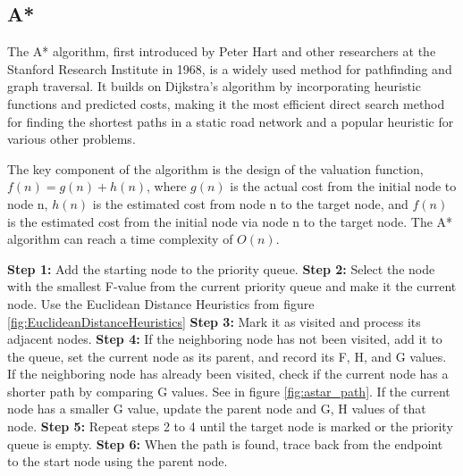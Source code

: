 \documentclass[bibliography=totoc]{scrartcl}
\begin{document}
\subsection{A*}

The A* algorithm, first introduced by Peter Hart and other researchers at the Stanford Research Institute in 1968, is a widely used method for pathfinding and graph traversal. \cite{4082128} It builds on Dijkstra's algorithm by incorporating heuristic functions and predicted costs, making it the most efficient direct search method for finding the shortest paths in a static road network and a popular heuristic for various other problems.\cite{ProbabilisticApproachCollaborativeMultiRobotLocalization}

The key component of the algorithm is the design of the valuation function, $f(n) = g(n) + h(n)$, where $g(n)$ is the actual cost from the initial node to node n, $h(n)$ is the estimated cost from node n to the target node, and $f(n)$ is the estimated cost from the initial node via node n to the target node. The A* algorithm can reach a time complexity of $O(n)$.

\textbf{Step 1:} Add the starting node to the priority queue.
\newline
\textbf{Step 2:} Select the node with the smallest F-value from the current priority queue and make it the current node. Use the Euclidean Distance Heuristics from figure \ref{fig:EuclideanDistanceHeuristics}
\newline
\textbf{Step 3:} Mark it as visited and process its adjacent nodes.
\newline
\textbf{Step 4:} If the neighboring node has not been visited, add it to the queue, set the current node as its parent, and record its F, H, and G values. 
If the neighboring node has already been visited, check if the current node has a shorter path by comparing G values. See in figure \ref{fig:astar_path}.
If the current node has a smaller G value, update the parent node and G, H values of that node.
\newline
\textbf{Step 5:} Repeat steps 2 to 4 until the target node is marked or the priority queue is empty.
\newline
\textbf{Step 6:} When the path is found, trace back from the endpoint to the start node using the parent node.
\end{document}

